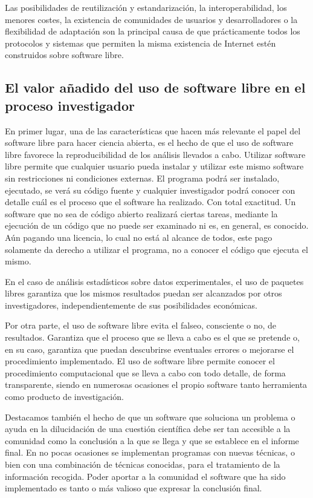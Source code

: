 \documentclass[10pt,twoside,spanish]{article}
\numberwithin{equation}{section}
\begin{document}
Las posibilidades de reutilización y estandarización, la interoperabilidad, los menores costes, la existencia de comunidades de usuarios y desarrolladores o la flexibilidad de adaptación son la principal causa de que prácticamente todos los protocolos y sistemas que permiten la misma existencia de Internet estén construidos sobre software libre.

\subsection{El valor añadido del uso de software libre en el proceso investigador}

En primer lugar, una de las características que hacen más relevante el papel del software libre para hacer ciencia abierta, es el hecho de que el uso de software libre favorece la reproducibilidad de los análisis llevados a cabo. Utilizar software libre permite que cualquier usuario pueda instalar y utilizar este mismo software sin restricciones ni condiciones externas. El programa podrá ser instalado, ejecutado, se verá su código fuente y cualquier investigador podrá conocer con detalle cuál es el proceso que el software ha realizado. Con total exactitud. Un software que no sea de código abierto realizará ciertas tareas, mediante la ejecución de un código que no puede ser examinado ni es, en general, es conocido. Aún pagando una licencia, lo cual no está al alcance de todos, este pago solamente da derecho a utilizar el programa, no a conocer el código que ejecuta el mismo.  

En el caso de análisis estadísticos sobre datos experimentales, el uso de paquetes libres garantiza que los mismos resultados puedan ser alcanzados por otros investigadores, independientemente de sus posibilidades económicas. 

Por otra parte, el uso de software libre evita el falseo, consciente o no, de resultados. Garantiza que el proceso que se lleva a cabo es el que se pretende o, en su caso, garantiza que puedan descubrirse eventuales errores o mejorarse el procedimiento implementado. El uso de software libre permite conocer el procedimiento computacional que se lleva a cabo con todo detalle, de forma transparente, siendo en numerosas ocasiones el propio software tanto herramienta como producto de investigación.

Destacamos también el hecho de que un software que soluciona un problema o ayuda en la dilucidación de una cuestión científica debe ser tan accesible a la comunidad como la conclusión a la que se llega y que se establece en el informe final. En no pocas ocasiones se implementan programas con nuevas técnicas, o bien con una combinación de técnicas conocidas, para el tratamiento de la información recogida. Poder aportar a la comunidad el software que ha sido implementado es tanto o más valioso que expresar la conclusión final.   
\end{document}
